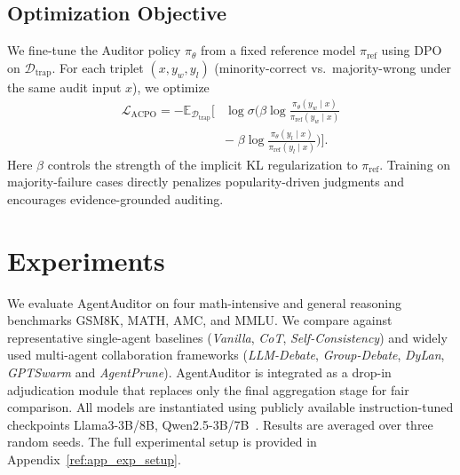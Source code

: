 \documentclass{article}
\theoremstyle{plain}
\theoremstyle{definition}
\theoremstyle{remark}
\begin{document}
\subsection{Optimization Objective}
We fine-tune the Auditor policy $\pi_{\theta}$ from a fixed reference model $\pi_{\mathrm{ref}}$ using DPO on $\mathcal{D}_{\mathrm{trap}}$.
For each triplet $(x,y_w,y_l)$ (minority-correct vs.\ majority-wrong under the same audit input $x$), we optimize
\begin{equation}
\begin{aligned}
\mathcal{L}_{\text{ACPO}}
= - \mathbb{E}_{\mathcal{D}_{\mathrm{trap}}}\Bigg[&
\log \sigma\!\Bigg(
\beta \log \frac{\pi_{\theta}(y_w \mid x)}{\pi_{\mathrm{ref}}(y_w \mid x)}\\
&-\; \beta \log \frac{\pi_{\theta}(y_l \mid x)}{\pi_{\mathrm{ref}}(y_l \mid x)}
\Bigg)
\Bigg]
.
\end{aligned}
\end{equation}
Here $\beta$ controls the strength of the implicit KL regularization to $\pi_{\mathrm{ref}}$.
Training on majority-failure cases directly penalizes popularity-driven judgments and encourages evidence-grounded auditing.





\section{Experiments}


We evaluate AgentAuditor on four math-intensive and general reasoning benchmarks GSM8K, MATH, AMC, and MMLU. We compare against representative single-agent baselines (\textit{Vanilla}, \textit{CoT}, \textit{Self-Consistency}) and widely used multi-agent collaboration frameworks (\textit{LLM-Debate}, \textit{Group-Debate}, \textit{DyLan}, \textit{GPTSwarm} and \textit{AgentPrune}). AgentAuditor is integrated as a drop-in adjudication module that replaces only the final aggregation stage for fair comparison. All models are instantiated using publicly available instruction-tuned checkpoints Llama3-3B/8B, Qwen2.5-3B/7B~\cite{dubey2024llama,bai2023qwen}. Results are averaged over three random seeds. The full experimental setup is provided in Appendix~\ref{ref:app_exp_setup}.
\end{document}
